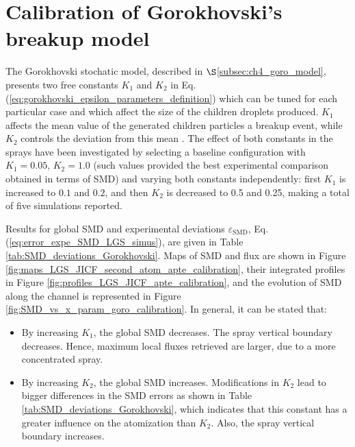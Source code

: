 \chapter{Calibration of Gorokhovski's breakup model}
\label{app:second_atom_goro_calibration}


The Gorokhovski stochatic model, described in $\S$\ref{subsec:ch4_goro_model}, presents two free constants $K_1$ and $K_2$ in Eq. (\ref{eq:gorokhovski_epsilon_parameters_definition}) which can be tuned for each particular case and which affect the size of the children droplets produced.  $K_1$ affects the mean value of the generated children particles a breakup event, while $K_2$ controls the deviation from this mean . The effect of both constants in the sprays have been investigated by selecting a baseline configuration with $K_1 = 0.05$, $K_2 = 1.0$ (such values provided the best experimental comparison obtained in terms of SMD) and varying both constants independently: first $K_1$ is increased to $0.1$ and $0.2$, and then $K_2$ is decreased to 0.5 and 0.25, making a total of five simulations reported. 

Results for global SMD and experimental deviations $\varepsilon_\mathrm{SMD}$, Eq. (\ref{eq:error_expe_SMD_LGS_simus}), are given in Table \ref{tab:SMD_deviations_Gorokhovski}. Maps of SMD and flux are shown in Figure \ref{fig:maps_LGS_JICF_second_atom_apte_calibration}, their integrated profiles in Figure \ref{fig:profiles_LGS_JICF_apte_calibration}, and the evolution of SMD along the channel is represented in Figure \ref{fig:SMD_vs_x_param_goro_calibration}. In general, it can be stated that:

\begin{itemize}

	\item By increasing $K_1$, the global SMD decreases. The spray vertical boundary decreases. Hence, maximum local fluxes retrieved are larger, due to a more concentrated spray.
	
	\item By increasing $K_2$, the global SMD increases. Modifications in $K_2$ lead to bigger differences in the SMD errors as shown in Table \ref{tab:SMD_deviations_Gorokhovski}, which indicates that this constant has a greater influence on the atomization than $K_2$. Also, the spray vertical boundary increases. 

\end{itemize}



